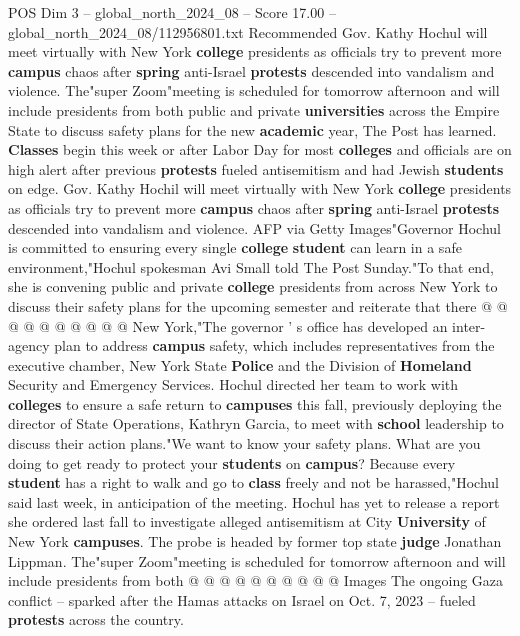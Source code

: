 \begin{textsample}{POS Dim 3 – global\_north\_2024\_08 – Score 17.00 – global\_north\_2024\_08/112956801.txt}  \label{ex:f3_pos_148}
Recommended Gov.
Kathy Hochul will meet virtually with New York \textbf{college} presidents as officials try to prevent more \textbf{campus} chaos after \textbf{spring} anti-Israel \textbf{protests} descended into vandalism and violence.
The"super Zoom"meeting is scheduled for tomorrow afternoon and will include presidents from both public and private \textbf{universities} across the Empire State to discuss safety plans for the new \textbf{academic} year, The Post has learned. \textbf{Classes} begin this week or after Labor Day for most \textbf{colleges} and officials are on high alert after previous \textbf{protests} fueled antisemitism and had Jewish \textbf{students} on edge.
Gov.
Kathy Hochil will meet virtually with New York \textbf{college} presidents as officials try to prevent more \textbf{campus} chaos after \textbf{spring} anti-Israel \textbf{protests} descended into vandalism and violence.
AFP via Getty Images"Governor Hochul is committed to ensuring every single \textbf{college} \textbf{student} can learn in a safe environment,"Hochul spokesman Avi Small told The Post Sunday."To that end, she is convening public and private \textbf{college} presidents from across New York to discuss their safety plans for the upcoming semester and reiterate that there @ @ @ @ @ @ @ @ @ @ New York,"The governor ' s office has developed an inter-agency plan to address \textbf{campus} safety, which includes representatives from the executive chamber, New York State \textbf{Police} and the Division of \textbf{Homeland} Security and Emergency Services.
Hochul directed her team to work with \textbf{colleges} to ensure a safe return to \textbf{campuses} this fall, previously deploying the director of State Operations, Kathryn Garcia, to meet with \textbf{school} leadership to discuss their action plans."We want to know your safety plans.
What are you doing to get ready to protect your \textbf{students} on \textbf{campus}?
Because every \textbf{student} has a right to walk and go to \textbf{class} freely and not be harassed,"Hochul said last week, in anticipation of the meeting.
Hochul has yet to release a report she ordered last fall to investigate alleged antisemitism at City \textbf{University} of New York \textbf{campuses}.
The probe is headed by former top state \textbf{judge} Jonathan Lippman.
The"super Zoom"meeting is scheduled for tomorrow afternoon and will include presidents from both @ @ @ @ @ @ @ @ @ @ Images The ongoing Gaza conflict -- sparked after the Hamas attacks on Israel on Oct. 7, 2023 -- fueled \textbf{protests} across the country.

\end{textsample}
